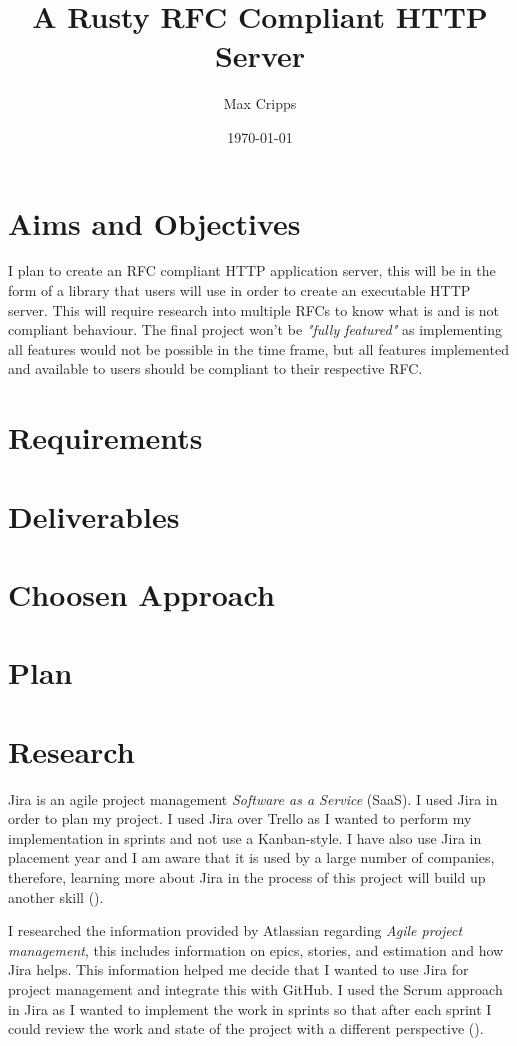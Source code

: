\documentclass[12pt, a4paper]{article}
\title{A Rusty RFC Compliant HTTP Server}
\author{Max Cripps}
\date{\today}
\begin{document}
\maketitle 

\section{Aims and Objectives}

I plan to create an RFC compliant HTTP application server, this will be in the form of a library that
users will use in order to create an executable HTTP server. This will require research into multiple
RFCs to know what is and is not compliant behaviour. The final project won't be
\emph{"fully featured"} as implementing all features would not be possible in the time frame,
but all features implemented and available to users should be compliant to their respective RFC.

\section{Requirements}

\section{Deliverables}

\section{Choosen Approach}

\section{Plan}

\section{Research}

Jira is an agile project management \emph{Software as a Service} (SaaS). I used Jira in order to
plan my project. I used Jira over Trello as I wanted to perform my implementation in
sprints and not use a Kanban-style. I have also use Jira in placement year and I am aware that it 
is used by a large number of companies, therefore, learning more about Jira in the process of this 
project will build up another skill (\cite{jira}).


I researched the information provided by Atlassian regarding \emph{Agile project management},
this includes information on epics, stories, and estimation and how Jira helps. This information
helped me decide that I wanted to use Jira for project management and integrate this with GitHub.
I used the Scrum approach in Jira as I wanted to implement the work in sprints so that after each
sprint I could review the work and state of the project with a different perspective
(\cite{jira-agile-info}). 
\end{document}
